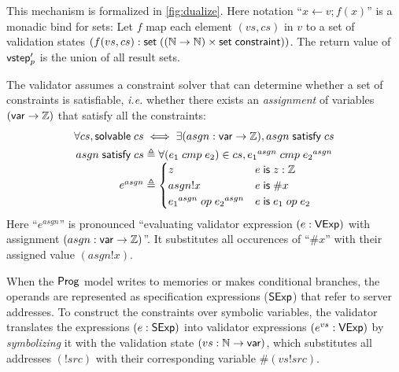 This mechanism is formalized in \autoref{fig:dualize}.  Here notation ``$x\gets
v;f(x)$'' is a monadic bind for sets: Let $f$ map each element $(vs,cs)$ in $v$
to a set of validation states
$(f(vs,cs):\mathsf{set}\;((\mathbb N\to\mathbb N)\times\mathsf{set}\;\mathsf{constraint}))$.  The return value of
$\mathsf{vstep}_p'$ is the union of all result sets.

The validator assumes a constraint solver that can determine whether a set of
constraints is satisfiable, {\it i.e.} whether there exists an {\em assignment}
of variables $(\mathsf{var}\to\mathbb Z)$ that satisfy all the constraints:
\begin{gather*}
  \forall cs,\solvable cs\iff\exists (asgn:\Var\to\Int),\satisfy{asgn}cs\\
  \begin{array}{r@{\;}l}
    \satisfy{asgn}cs\triangleq&\forall(e_1\ccmp e_2)\in cs, {e_1}^{asgn}\ccmp{e_2}^{asgn}\\
    e^{asgn}\triangleq&\begin{cases}
      z&e\Is z:\Int\\
      asgn!x&e\Is \#x\\
      {e_1}^{asgn}\oop{e_2}^{asgn}&e\Is e_1\oop e_2
    \end{cases}
  \end{array}
\end{gather*}
Here ``$e^{asgn}$'' is pronounced ``evaluating validator expression $(e:\mathsf{VExp})$
with assignment $(asgn:\mathsf{var}\to\mathbb Z)$''.  It substitutes all occurences of
``$\#x$'' with their assigned value $(asgn!x)$.

When the $\mathsf{Prog}$ model writes to memories or makes conditional branches, the
operands are represented as specification expressions ($\mathsf{SExp}$) that refer to
server addresses.  To construct the constraints over symbolic variables, the
validator translates the expressions $(e:\mathsf{SExp})$ into validator expressions
$(e^{vs}:\mathsf{VExp})$ by {\em symbolizing} it with the validation state
$(vs:\mathbb N\to\mathsf{var})$, which substitutes all addresses $(!src)$ with their
corresponding variable $\#(vs!src)$.

